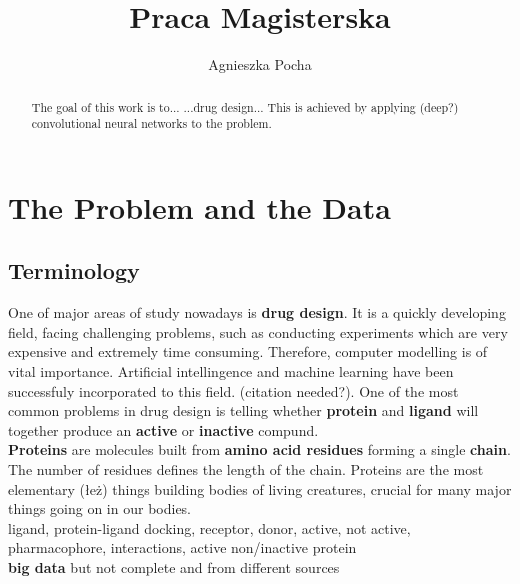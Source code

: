 \documentclass[a4paper,10pt]{report}
\title{Praca Magisterska}
\author{Agnieszka Pocha}
\begin{document}
  \maketitle
  \begin{abstract}
    The goal of this work is to... ...drug design... This is achieved by applying (deep?) convolutional neural networks to the problem.
  \end{abstract}
  \tableofcontents
  
  
  \chapter{The Problem and the Data}
    
    \section{Terminology} %
    One of major areas of study nowadays is \textbf{drug design}. It is a quickly developing field, facing challenging problems, such as conducting experiments which are very expensive and extremely time consuming. Therefore, computer modelling is of vital importance. Artificial intellingence and machine learning have been successfuly incorporated to this field. (citation needed?). One of the most common problems in drug design is telling whether \textbf{protein} and \textbf{ligand} will together produce an \textbf{active} or \textbf{inactive} compund.\\
    
    \textbf{Proteins} are molecules built from \textbf{amino acid residues} forming a single \textbf{chain}. The number of residues defines the length of the chain. Proteins are the most elementary (łeż) things building bodies of living creatures, crucial for many major things going on in our bodies.\\
    
    ligand, protein-ligand docking, receptor, donor, active, not active, pharmacophore, interactions, active non/inactive protein\\
    
    \textbf{big data} but not complete and from different sources\\
         
\end{document}
